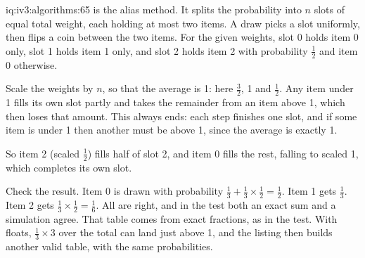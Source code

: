 \begin{solution}{iq:iv3:algorithms:65}
 is the alias method. It splits the probability into $n$ slots of equal total weight, each holding at most two items. A draw picks a slot uniformly, then flips a coin between the two items. For the given weights, slot 0 holds item 0 only, slot 1 holds item 1 only, and slot 2 holds item 2 with probability $\frac{1}{2}$ and item 0 otherwise.
\label{lst:iv3:al:alias}

Scale the weights by $n$, so that the average is 1: here $\frac{3}{2}$, 1 and $\frac{1}{2}$. Any item under 1 fills its own slot partly and takes the remainder from an item above 1, which then loses that amount. This always ends: each step finishes one slot, and if some item is under 1 then another must be above 1, since the average is exactly 1.

So item 2 (scaled $\frac{1}{2}$) fills half of slot 2, and item 0 fills the rest, falling to scaled 1, which completes its own slot.

Check the result. Item 0 is drawn with probability $\frac{1}{3} + \frac{1}{3} \times \frac{1}{2} = \frac{1}{2}$. Item 1 gets $\frac{1}{3}$. Item 2 gets $\frac{1}{3} \times \frac{1}{2} = \frac{1}{6}$. All are right, and in the test both an exact sum and a simulation agree. That table comes from exact fractions, as in the test. With floats, $\frac{1}{3} \times 3$ over the total can land just above 1, and the listing then builds another valid table, with the same probabilities.

\end{solution}

